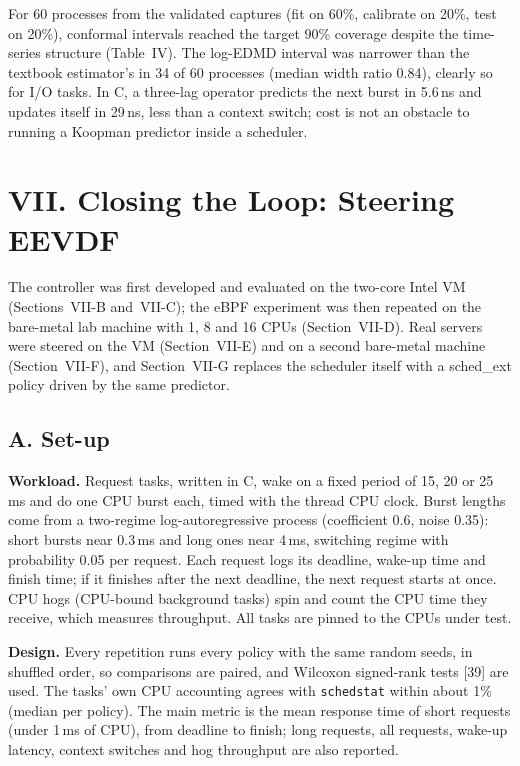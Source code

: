\documentclass{article}
\begin{document}
For 60 processes from the validated captures (fit on 60\%, calibrate on 20\%, test on 20\%), conformal intervals reached the target 90\% coverage despite the time-series structure (Table~IV). The log-EDMD interval was narrower than the textbook estimator's in 34 of 60 processes (median width ratio 0.84), clearly so for I/O tasks. In C, a three-lag operator predicts the next burst in 5.6\,ns and updates itself in 29\,ns, less than a context switch; cost is not an obstacle to running a Koopman predictor inside a scheduler.

\section*{VII. Closing the Loop: Steering EEVDF}
The controller was first developed and evaluated on the two-core Intel VM (Sections~VII-B and~VII-C); the eBPF experiment was then repeated on the bare-metal lab machine with 1, 8 and 16 CPUs (Section~VII-D). Real servers were steered on the VM (Section~VII-E) and on a second bare-metal machine (Section~VII-F), and Section~VII-G replaces the scheduler itself with a sched\_ext policy driven by the same predictor.

\subsection*{A. Set-up}
\textbf{Workload.} Request tasks, written in C, wake on a fixed period of 15, 20 or 25\,ms and do one CPU burst each, timed with the thread CPU clock. Burst lengths come from a two-regime log-autoregressive process (coefficient 0.6, noise 0.35): short bursts near 0.3\,ms and long ones near 4\,ms, switching regime with probability 0.05 per request. Each request logs its deadline, wake-up time and finish time; if it finishes after the next deadline, the next request starts at once. CPU hogs (CPU-bound background tasks) spin and count the CPU time they receive, which measures throughput. All tasks are pinned to the CPUs under test.

\textbf{Design.} Every repetition runs every policy with the same random seeds, in shuffled order, so comparisons are paired, and Wilcoxon signed-rank tests [39] are used. The tasks' own CPU accounting agrees with \texttt{schedstat} within about 1\% (median per policy). The main metric is the mean response time of short requests (under 1\,ms of CPU), from deadline to finish; long requests, all requests, wake-up latency, context switches and hog throughput are also reported.
\end{document}
